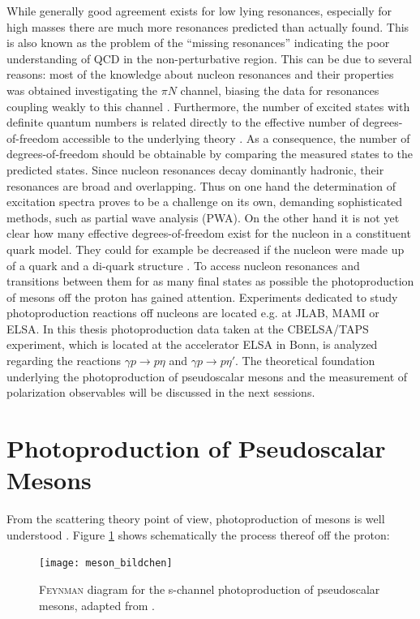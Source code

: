 While generally good agreement exists for low lying resonances, especially for high masses there are much more resonances predicted than actually found. This is also known as the problem of the \enquote{missing resonances} indicating the poor understanding of QCD in the non-perturbative region. This can be due to several reasons: most of the knowledge about nucleon resonances and their properties was obtained investigating the $\pi N$ channel, biasing the data for resonances coupling weakly to this channel \cite{met08}. Furthermore, the number of excited states with definite quantum numbers is related directly to the effective number of degrees-of-freedom accessible to the underlying theory \cite{pdg}. As a consequence, the number of degrees-of-freedom should be obtainable by comparing the measured states to the predicted states. Since nucleon resonances decay dominantly hadronic, their resonances are broad and overlapping. Thus on one hand the determination of excitation spectra proves to be a challenge on its own, demanding sophisticated methods, such as partial wave analysis (PWA). On the other hand it is not yet clear how many effective degrees-of-freedom exist for the nucleon in a constituent quark model. They could for example be decreased if the nucleon were made up of a quark and a di-quark structure \cite{anselmino}. To access nucleon resonances and transitions between them for as many final states as possible the photoproduction of mesons off the proton has gained attention. Experiments dedicated to study photoproduction reactions off nucleons are located e.g. at JLAB, MAMI or ELSA. In this thesis photoproduction data taken at the CBELSA/TAPS experiment, which is located at the accelerator ELSA in Bonn, is analyzed regarding the reactions $\gamma p \to p \eta$ and $\gamma p \to p \eta'$. The theoretical foundation underlying the photoproduction of pseudoscalar mesons and the measurement of polarization observables will be discussed in the next sessions.
\section{Photoproduction of Pseudoscalar Mesons}
From the scattering theory point of view, photoproduction of mesons is well understood \cite{Krusche}. Figure \ref{fig:mes_bildchen} shows schematically the process thereof off the proton:

\begin{figure}[htbp]
	\centering
	\texttt{[image: meson\_bildchen]}
	\caption{\textsc{Feynman} diagram for the s-channel photoproduction of pseudoscalar mesons, adapted from \cite{farahphd}.}
	\label{fig:mes_bildchen}
\end{figure}

